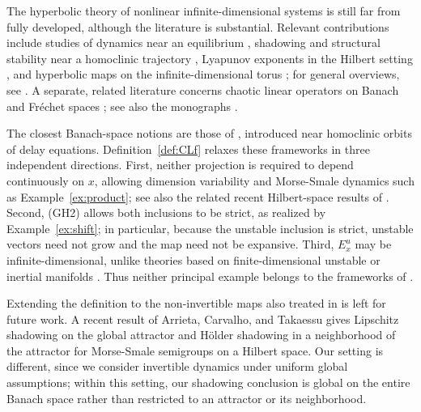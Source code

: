 \documentclass[12pt]{article}
\theoremstyle{definition}
\begin{document}
The hyperbolic theory of nonlinear infinite-dimensional systems is still far from fully developed, although the literature is substantial. 
Relevant contributions include studies of dynamics near an equilibrium \cite{Palis1968,FSSW1996,FiedlerTuraev1998,YWPT2022}, shadowing and structural stability near a homoclinic trajectory \cite{SteinleinWalther1989,SteinleinWalther1990,LaniWayda1995,LaniWayda1995-2,LaniWayda1999,Li2003,Zeng1995,Blazquez1986}, Lyapunov exponents in the Hilbert setting \cite{LianYoung2012}, and hyperbolic maps on the infinite-dimensional torus \cite{Glyzin1,Glyzin9}; for general overviews, see \cite{Henry1981,SellYou,Li2004}.
A separate, related literature concerns chaotic linear operators on Banach and Fréchet spaces \cite{GodefroyShapiro1991,HouTianZhu2012,MartínezGimenezOprochaPeris2013,BBMP2013,BBPW2018,BernardesMessaoudi2021,BMGR2025,Nilson25,BBP2026,BV2025,Puj18,NilsonAli,NilsonPeris}; see also the monographs \cite{BayartMatheron2009,GrosseErdmannPerisManguillot2011}.

The closest Banach-space notions are those of \cite{SteinleinWalther1990,LaniWayda1995}, introduced near homoclinic orbits of delay equations. Definition~\ref{def:CLf} relaxes these frameworks in three independent directions. 
First, neither projection is required to depend continuously on $x$, allowing dimension variability and Morse-Smale dynamics such as Example~\ref{ex:product}; see also the related recent Hilbert-space results of \cite{ACK2025}. 
Second, {\rm(GH2)} allows both inclusions to be strict, as realized by Example~\ref{ex:shift}; in particular, because the unstable inclusion is strict, unstable vectors need not grow and the map need not be expansive.
Third, $E_x^u$ may be infinite-dimensional, unlike theories based on finite-dimensional unstable or inertial manifolds \cite{Henry1981,SellYou,DKKP2012}. 
Thus neither principal example belongs to the frameworks of \cite{SteinleinWalther1990,LaniWayda1995,Henry1981,SellYou}. 

Extending the definition to the non-invertible maps also treated in \cite{SteinleinWalther1990,LaniWayda1995} is left for future work. A recent result of Arrieta, Carvalho, and Takaessu \cite{ACK2025} gives Lipschitz shadowing on the global attractor and H\"older shadowing in a neighborhood of the attractor for Morse-Smale semigroups on a Hilbert space. Our setting is different, since we consider invertible dynamics under uniform global assumptions; within this setting, our shadowing conclusion is global on the entire Banach space rather than restricted to an attractor or its neighborhood.
\end{document}
